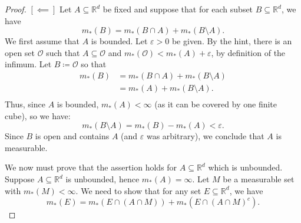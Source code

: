 \begin{proof}
\noindent \( [\impliedby] \) Let \( A \subseteq \mathbb{R}^{d}  \) be fixed and suppose that for each subset \( B \subseteq \mathbb{R}^{d}  \), we have \[ m_*(B) = m_*(B \cap A) + m_*(B \setminus A).  \] We first assume that \( A \) is bounded. Let \( \varepsilon > 0 \) be given. By the hint, there is an open set \( \mathcal{O}  \) such that \( A \subseteq \mathcal{O}  \) and \( m_*(\mathcal{O} ) < m_*(A) + \varepsilon  \), by definition of the infimum. Let \( B \coloneqq \mathcal{O}  \) so that
\begin{align*}
	m_*(B)  &= m_*(B \cap A) + m_*(B \setminus A)   \\	
		&= m_*(A) + m_*(B \setminus A). \tag{\( A \subseteq B \implies A = B \cap A \) } \\
\end{align*}
Thus, since \( A \) is bounded, \( m_*(A) < \infty \) (as it can be covered by one finite cube), so we have: \[m_*(B \setminus A) = m_*(B) - m_*(A) < \varepsilon .   \] Since \( B \) is open and contains \( A \) (and \( \varepsilon  \) was arbitrary), we conclude that \( A \) is measurable.

We now must prove that the assertion holds for \( A \subseteq \mathbb{R}^{d}  \) which is unbounded. Suppose \( A \subseteq \mathbb{R}^{d}  \) is unbounded, hence \( m_*(A) = \infty \). Let \( M \) be a measurable set with \( m_*(M) < \infty \). We need to show that for any set \( E \subseteq \mathbb{R}^{d}  \), we have \[m_*(E) = m_*(E \cap (A \cap M)) + m_*(E \cap (A \cap M)^{c} ).  \] 


\end{proof}
